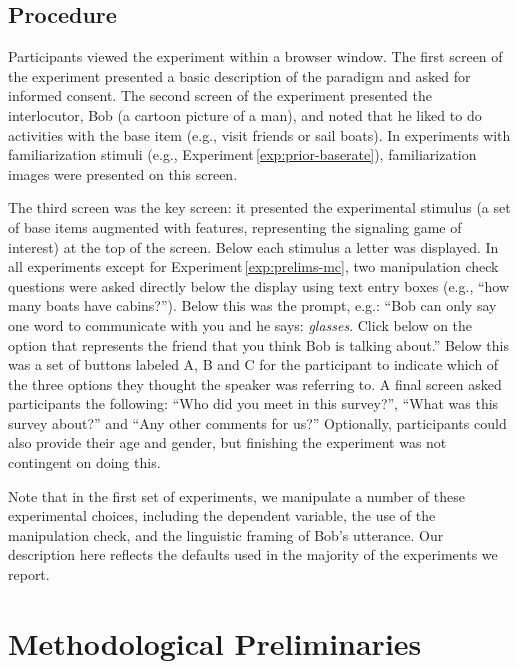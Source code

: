 \documentclass[man,noapacite]{apa2}
\newcounter{Experiment}
\newcommand{\exptref}[1]{Experiment\,\ref{#1}}
\begin{document}
\subsection{Procedure}

Participants viewed the experiment within a browser window. The first screen of the experiment presented a basic description of the paradigm and asked for informed consent. The second screen of the experiment presented the interlocutor, Bob (a cartoon picture of a man), and noted that he liked to do activities with the base item (e.g., visit friends or sail boats). In experiments with familiarization stimuli (e.g., \exptref{exp:prior-baserate}),  familiarization images were presented on this screen.

The third screen was the key screen: it presented the experimental stimulus (a set of base items augmented with features, representing the signaling game of interest) at the top of the screen. Below each stimulus a letter was displayed.
In all experiments except for \exptref{exp:prelims-mc}, two manipulation check questions were asked directly below the display using text entry boxes (e.g., ``how many boats have cabins?''). Below this was the prompt, e.g.: ``Bob can only say one word to communicate with you and he says: {\it glasses}. Click below on the option that represents the friend that you think Bob is talking about.'' Below this was a set of buttons labeled A, B and C for the participant to indicate which of the three options they thought the speaker was referring to. A final screen asked participants the following: ``Who did you meet in this survey?'',  ``What was this survey about?'' and ``Any other comments for us?'' Optionally, participants could also provide their age and gender, but finishing the experiment was not contingent on doing this.

Note that in the first set of experiments, we manipulate a number of these experimental choices, including the dependent variable, the use of the manipulation check, and the linguistic framing of Bob's utterance. Our description here reflects the defaults used in the majority of the experiments we report.



\section{Methodological Preliminaries}
\label{sec:prelims}
\end{document}
